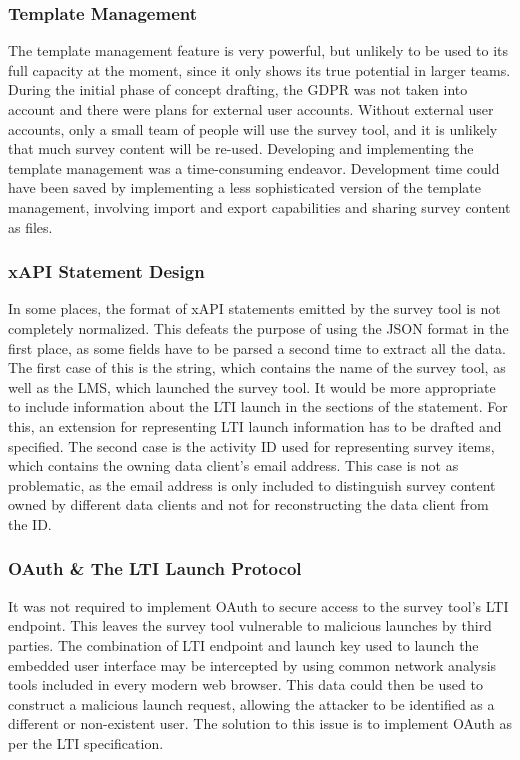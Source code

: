     	\subsubsection{Template Management}
    		The template management feature is very powerful, but unlikely to
    		be used to its full capacity at the moment, since it only
    		shows its true potential in larger teams. During the initial
    		phase of concept drafting, the GDPR was not taken into account
    		and there were plans for external user accounts. Without
    		external user accounts, only a small team of people will
    		use the survey tool, and it is unlikely that much survey content
    		will be re-used. Developing and implementing the template
    		management was a time-consuming endeavor. Development
    		time could have been saved by implementing a less sophisticated
    		version of the template management, involving import and export
    		capabilities and sharing survey content as files.

	   	\subsubsection{xAPI Statement Design}
	   		In some places, the format of xAPI statements emitted by
	   		the survey tool is not completely normalized. This defeats
	   		the purpose of using the JSON format in the first place,
	   		as some fields have to be parsed a second time to extract all the
	   		data. The first case of this is the  string,
	   		which contains the name of the survey tool, as well as the
	   		LMS, which launched the survey tool. It would be more appropriate
	   		to include information about the LTI launch in the
	   		 sections of the statement. For this,
	   		an extension for representing LTI launch information
	   		has to be drafted and specified.
	   		The second case is the activity ID used for representing
	   		survey items, which contains the owning data client's
	   		email address. This case is not as problematic, as the
	   		email address is only included to distinguish survey
	   		content owned by different data clients and not for
	   		reconstructing the data client from the ID.

		\subsubsection{OAuth \& The LTI Launch Protocol}
			It was not required to implement OAuth to secure
			access to the survey tool's LTI endpoint.
			This leaves the survey tool vulnerable to malicious
			launches by third parties. The combination of
			LTI endpoint and launch key used to launch the embedded
			user interface may be intercepted by using common
			network analysis tools included in every modern
			web browser. This data could then be used to construct
			a malicious launch request, allowing the attacker
			to be identified as a different or non-existent user.
			The solution to this issue is to implement OAuth
			as per the LTI specification.


